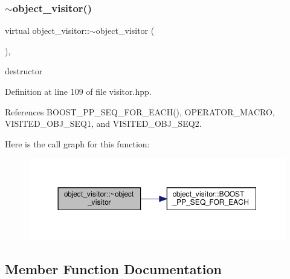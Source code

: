 \subsubsection{\texorpdfstring{$\sim$object\+\_\+visitor()}{~object\_visitor()}}
{\footnotesize\ttfamily virtual object\+\_\+visitor\+::$\sim$object\+\_\+visitor (\begin{DoxyParamCaption}{ }\end{DoxyParamCaption})\hspace{0.3cm}{\ttfamily [inline]}, {\ttfamily [virtual]}}



destructor 



Definition at line 109 of file visitor.\+hpp.



References B\+O\+O\+S\+T\+\_\+\+P\+P\+\_\+\+S\+E\+Q\+\_\+\+F\+O\+R\+\_\+\+E\+A\+C\+H(), O\+P\+E\+R\+A\+T\+O\+R\+\_\+\+M\+A\+C\+RO, V\+I\+S\+I\+T\+E\+D\+\_\+\+O\+B\+J\+\_\+\+S\+E\+Q1, and V\+I\+S\+I\+T\+E\+D\+\_\+\+O\+B\+J\+\_\+\+S\+E\+Q2.

Here is the call graph for this function\+:
\nopagebreak
\begin{figure}[H]
\begin{center}
\leavevmode
\includegraphics[width=350pt]{d3/d80/classobject__visitor_a02523317c24979b23ee7d59ab6c513ba_cgraph}
\end{center}
\end{figure}


\subsection{Member Function Documentation}
\mbox{\label{classobject__visitor_a8989fde00dd4d9857903436e5b020d46}} 

